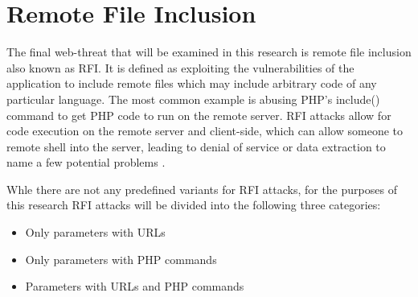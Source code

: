 \section{Remote File Inclusion}\label{sec:rfiExplanation}

The final web-threat that will be examined in this research is remote file inclusion also known as RFI.  It is defined as exploiting the vulnerabilities of the application to include remote files which may include arbitrary code of any particular language.  The most common example is abusing PHP's include() command to get PHP code to run on the remote server.  RFI attacks allow for code execution on the remote server and client-side, which can allow someone to remote shell into the server, leading to denial of service or data extraction to name a few potential problems \cite{owaspRFI}.

Whle there are not any predefined variants for RFI attacks, for the purposes of this research RFI attacks will be divided into the following three categories:

\begin{itemize}
	\item Only parameters with URLs
	\item Only parameters with PHP commands
	\item Parameters with URLs and PHP commands
\end{itemize}
